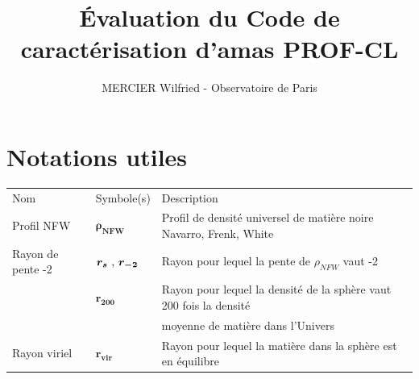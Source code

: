\documentclass[a4paper,11pt]{article}
\numberwithin{equation}{section}
\begin{document}
  

\title{\LARGE \bf Évaluation du Code de caractérisation d'amas PROF-CL}
\author{MERCIER Wilfried - Observatoire de Paris}
\maketitle

\newpage  %

\section{Notations utiles}  %

\begin{tabular}{l l l}   %
  Nom & Symbole(s) & Description \\   %
  Profil NFW & $\bm{\rho_{NFW}}$ & Profil de densité universel de matière noire Navarro, Frenk, White \\
  Rayon de pente -2 &  $\bm{r_s$} , \bm{$r_{-2}}$ & Rayon pour lequel la pente de $\rho_{NFW}$ vaut -2 \\
  & $\bm{r_{200}}$ & Rayon pour lequel la densité de la sphère vaut 200 fois la densité \\
  & & moyenne de matière dans l'Univers \\
  Rayon viriel & $\bm{r_{vir}}$ & Rayon pour lequel la matière dans la sphère est en équilibre
\end{tabular}

\newpage
\end{document}
